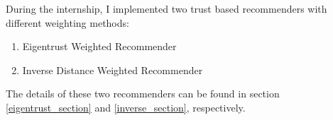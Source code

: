 	During the internship, I implemented two trust based recommenders with different weighting methods:
	\begin{enumerate}
		\item Eigentrust Weighted Recommender
		\item Inverse Distance Weighted Recommender
	\end{enumerate} 
	The details of these two recommenders can be found in section \ref{eigentrust_section} and \ref{inverse_section}, respectively.